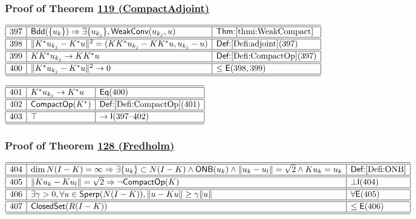 \documentclass[11pt,reqno]{amsart}
\begin{document}
\medskip

\subsubsection*{Proof of Theorem \hyperlink{thm:CompactAdjoint}{119 (\textsf{CompactAdjoint})}}

\noindent$%
\begin{array}{|r|l|l|}
\hline\hline
397 & \mathsf{Bdd}(\{u_{k}\})\Rightarrow\exists\{u_{k_{j}}\},\mathsf{WeakConv}(u_{k_{j}},u) & \textsf{Thm:}\ref{thmi:WeakCompact} \\ \hline\hline
398 & \|K^{*}u_{k_{j}}-K^{*}u\|^{2}=(KK^{*}u_{k_{j}}-KK^{*}u,u_{k_{j}}-u) & \textsf{Def:}\ref{Defi:adjoint}(397) \\ \hline\hline
399 & KK^{*}u_{k_{j}}\to KK^{*}u & \textsf{Def:}\ref{Defi:CompactOp}(397) \\ \hline\hline
400 & \|K^{*}u_{k_{j}}-K^{*}u\|^{2}\to0 & \le\mathsf{E}(398,399) \\ \hline\hline
\end{array}%
$

\medskip

\noindent$%
\begin{array}{|r|l|l|}
\hline\hline
401 & K^{*}u_{k_{j}}\to K^{*}u & \mathsf{Eq}(400) \\ \hline\hline
402 & \mathsf{CompactOp}(K^{*}) & \textsf{Def:}\ref{Defi:CompactOp}(401) \\ \hline\hline
403 & \top & \to\mathsf{I}(397\text{--}402) \\ \hline\hline
\end{array}%
$

\medskip

\subsubsection*{Proof of Theorem \hyperlink{thm:Fredholm}{128 (\textsf{Fredholm})}}

\noindent$%
\begin{array}{|r|l|l|}
\hline\hline
404 & \dim N(I-K)=\infty\Rightarrow\exists\{u_{k}\}\subset N(I-K)\wedge\mathsf{ONB}(u_{k})\wedge\|u_{k}-u_{l}\|=\sqrt2\wedge Ku_{k}=u_{k} & \textsf{Def:}\ref{Defi:ONB} \\ \hline\hline
405 & \|Ku_{k}-Ku_{l}\|=\sqrt2\Rightarrow\neg\mathsf{CompactOp}(K) & \bot\mathsf{I}(404) \\ \hline\hline
406 & \exists\gamma>0,\forall u\in\mathsf{Sperp}(N(I-K)),\|u-Ku\|\ge\gamma\|u\| & \forall\mathsf{E}(405) \\ \hline\hline
407 & \mathsf{ClosedSet}(R(I-K)) & \le\mathsf{E}(406) \\ \hline\hline
\end{array}%
$
\end{document}
